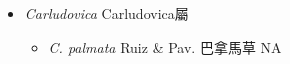 
  \begin{itemize}
 \item[] \textit{Carludovica} Carludovica屬
                                
  \begin{itemize}
        \item[] \textit{C. palmata} Ruiz \& Pav.  巴拿馬草   NA
  \end{itemize}
  \end{itemize}
